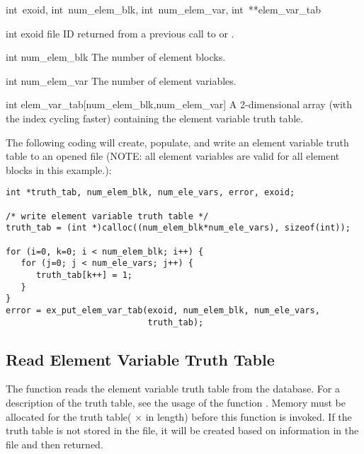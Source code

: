 {int~exoid, 
int~num_elem_blk, 
int~num_elem_var,
int~**elem_var_tab}

\begin{parameters}
\item[{int exoid \R{}}]
\exo{} file ID returned from a previous call to  
or .

\item[{int num_elem_blk \R{}}]
The number of element blocks.

\item[{int num_elem_var \R{}}]
The number of element variables.

\item[{int elem_var_tab[num_elem_blk,num_elem_var] \R{}}]
A 2-dimensional array (with the  index 
cycling faster) containing the element variable truth table.

\end{parameters}
The following coding will create, populate, and write an 
element variable truth table to an opened \exo{} file (NOTE: 
all element variables are valid for all element blocks in this 
example.):

\begin{lstlisting}
int *truth_tab, num_elem_blk, num_ele_vars, error, exoid;

/* write element variable truth table */
truth_tab = (int *)calloc((num_elem_blk*num_ele_vars), sizeof(int));

for (i=0, k=0; i < num_elem_blk; i++) {
   for (j=0; j < num_ele_vars; j++) {
      truth_tab[k++] = 1;
   }
}
error = ex_put_elem_var_tab(exoid, num_elem_blk, num_ele_vars, 
                            truth_tab);
\end{lstlisting}

\subsection{Read Element Variable Truth Table}

The function  reads the \exo{} element
variable truth table from the database. For a description of the truth
table, see the usage of the function
. Memory must be allocated for
the truth table( $\times$  in length)
before this function is invoked. If the truth table is not stored in
the file, it will be created based on information in the file and then
returned.

